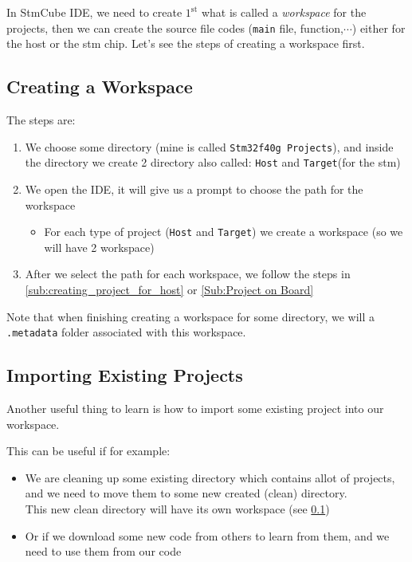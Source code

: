 In StmCube IDE, we need to create $\mathrm{1}^\mathrm{st}$ what is called a  \textit{workspace} for the projects, then we can create the source file codes (\verb|main| file, function,$\cdots$) either for the host or the stm chip. Let's see the steps of creating a workspace first.\\

\subsection{Creating a Workspace}
\label{Sub:creating_workspace}

The steps are:

\begin{enumerate}
    \item We choose some directory (mine is called \verb|Stm32f40g Projects|), and inside the directory we create 2 directory also called: \verb|Host| and \verb|Target|(for the stm)
    
    
    \item We open the IDE, it will give us a prompt to choose the path for the workspace
    
    
    \begin{itemize}
        \item For each type of project (\verb|Host| and \verb|Target|) we create a workspace (so we will have 2 workspace)
    \end{itemize}
    
    \item After we select the path for each workspace, we follow the steps in \ref{sub:creating_project_for_host} or \ref{Sub:Project on Board} 
    
    
\end{enumerate}

Note that when finishing creating a workspace for some directory, we will a \verb|.metadata| folder associated with this workspace.

\subsection{Importing Existing Projects}

Another useful thing to learn is how to import some existing project into our workspace.

This can be useful if for example:

\begin{itemize}
    \item We are cleaning up some existing directory which contains allot of projects, and we need to move them to some new created (clean) directory.\\
    
    This new clean directory will have its own workspace (see \ref{Sub:creating_workspace})
    
    \item Or if we download some new code from others to learn from them, and we need to use them from our code

\end{itemize}

